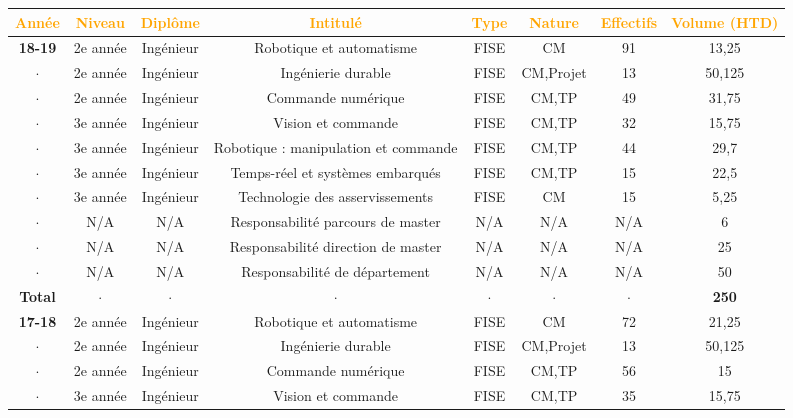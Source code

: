 \documentclass[a4paper,12pt]{article}
\begin{document}
\newpage

{\centering
\setlength{\tabcolsep}{2pt} %

\begin{tabular}{cccccccc} \toprule
    \textcolor{orange}{Année} & \textcolor{orange}{Niveau} & \textcolor{orange}{Diplôme} & \textcolor{orange}{Intitulé} & \textcolor{orange}{Type} & \textcolor{orange}{Nature} & \textcolor{orange}{Effectifs} & \textcolor{orange}{Volume (HTD)} \\ \midrule
 \bf{18-19} & 2e année  & Ingénieur & Robotique et automatisme & FISE & CM & 91 & 13,25 \\
 $\cdot$ & 2e année  & Ingénieur & Ingénierie durable  & FISE & CM,Projet & 13  & 50,125  \\
  $\cdot$ & 2e année  & Ingénieur & Commande numérique  & FISE & CM,TP & 49  & 31,75  \\
  $\cdot$ & 3e année  & Ingénieur & Vision et commande & FISE & CM,TP & 32 & 15,75  \\
  $\cdot$ & 3e année  & Ingénieur & Robotique : manipulation et commande & FISE & CM,TP & 44 & 29,7  \\
  $\cdot$ & 3e année  & Ingénieur & Temps-réel et systèmes embarqués & FISE & CM,TP & 15 & 22,5  \\
  $\cdot$ & 3e année  & Ingénieur & Technologie des asservissements & FISE & CM & 15 & 5,25  \\
  $\cdot$ & N/A       & N/A       & Responsabilité parcours de master & N/A & N/A & N/A & 6  \\
  $\cdot$ & N/A       & N/A       & Responsabilité direction de master & N/A & N/A & N/A & 25  \\
  $\cdot$ & N/A       & N/A       & Responsabilité de département & N/A & N/A & N/A & 50  \\
 \bf{Total} & $\cdot$ & $\cdot$ & $\cdot$ & $\cdot$ & $\cdot$ & $\cdot$ &  {\bf 250} \\\midrule
  \bf{17-18} & 2e année  & Ingénieur & Robotique et automatisme & FISE & CM & 72 & 21,25 \\
 $\cdot$ & 2e année  & Ingénieur & Ingénierie durable  & FISE & CM,Projet & 13  & 50,125  \\
  $\cdot$ & 2e année  & Ingénieur & Commande numérique  & FISE & CM,TP & 56  & 15  \\
  $\cdot$ & 3e année  & Ingénieur & Vision et commande & FISE & CM,TP & 35 & 15,75  \\

\end{tabular}}
\end{document}
